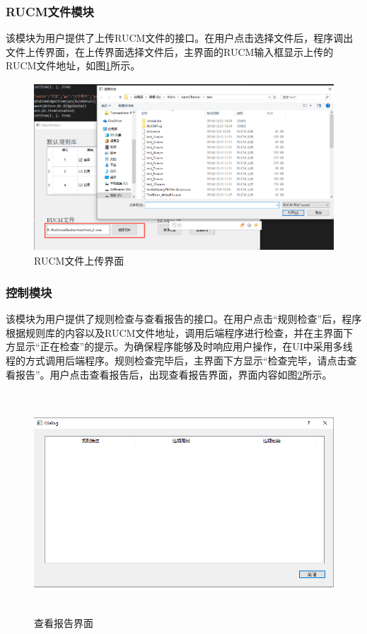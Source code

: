 	\subsubsection{RUCM文件模块}
		该模块为用户提供了上传RUCM文件的接口。在用户点击选择文件后，程序调出文件上传界面，在上传界面选择文件后，主界面的RUCM输入框显示上传的RUCM文件地址，如图\ref{fig-gui-7}所示。
		\begin{figure}[htbp]
			\centering
			\includegraphics[width=4.50000in,height=2.47792in]{src/gui-7.png}
			\caption{RUCM文件上传界面}
			\label{fig-gui-7}
		\end{figure}
	
	\subsubsection{控制模块}
		该模块为用户提供了规则检查与查看报告的接口。在用户点击``规则检查''后，程序根据规则库的内容以及RUCM文件地址，调用后端程序进行检查，并在主界面下方显示``正在检查''的提示。为确保程序能够及时响应用户操作，在UI中采用多线程的方式调用后端程序。规则检查完毕后，主界面下方显示``检查完毕，请点击查看报告''。用户点击查看报告后，出现查看报告界面，界面内容如图\ref{fig-gui-8}所示。
		\begin{figure}[htbp]
			\centering
			\includegraphics[width=5.77222in,height=3.26667in]{src/gui-8.png}
			\caption{查看报告界面}
			\label{fig-gui-8}
		\end{figure}